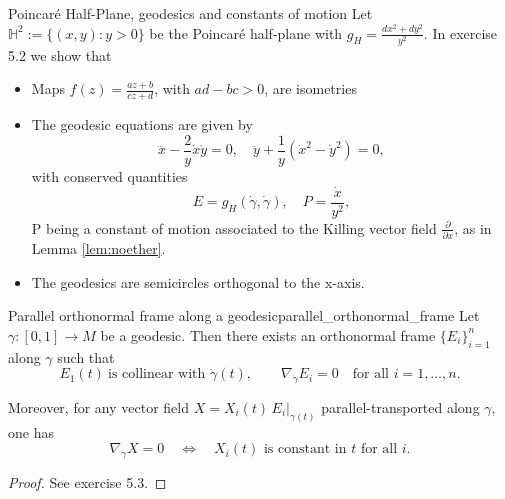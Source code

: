 \begin{colexample}{Poincaré Half-Plane, geodesics and constants of motion}{}
Let $\mathbb{H}^2:=\{(x,y):y>0\}$ be the Poincaré half-plane with $g_H = \frac{dx^2 + dy^2}{y^2}$. In exercise 5.2 we show that 
\begin{itemize}[itemsep=0pt, topsep=0pt]
    \item Maps $f(z) = \frac{az+b}{cz+d}$, with $ad-bc>0$, are isometries
    \item The geodesic equations are given by 
    \[
    \ddot{x} - \frac{2}{y} \dot{x}\dot{y} = 0, \quad 
    \ddot{y} + \frac{1}{y} (\dot{x}^2 - \dot{y}^2) = 0,
    \]
    with conserved quantities
    \[
    E = g_H(\dot{\gamma}, \dot{\gamma}), \quad P = \frac{\dot{x}}{y^2},
    \]  
    P being a constant of motion associated to the Killing vector field $\frac{\partial}{\partial x}$, as in Lemma \ref{lem:noether}.
\item The geodesics are semicircles orthogonal to the x-axis.
\end{itemize}
\end{colexample}

\begin{center}
\end{center}



\begin{colorlem}{Parallel orthonormal frame along a geodesic}{parallel_orthonormal_frame}
Let $\gamma:[0,1]\to M$ be a geodesic. Then there exists an orthonormal frame $\{E_i\}_{i=1}^n$ along $\gamma$ such that
\[
E_1(t)\ \text{is collinear with }\dot{\gamma}(t), 
\qquad
\nabla_{\dot{\gamma}}E_i=0 \quad \text{for all } i=1,\dots,n.
\]

Moreover, for any vector field $X=X_i(t)\,E_i|_{\gamma(t)}$ parallel-transported along $\gamma$, one has
\[
\nabla_{\dot{\gamma}}X=0
\quad\Longleftrightarrow\quad
X_i(t) \text{ is constant in $t$ for all } i.
\]
\end{colorlem}

\begin{proof}
See exercise 5.3.
\end{proof}



